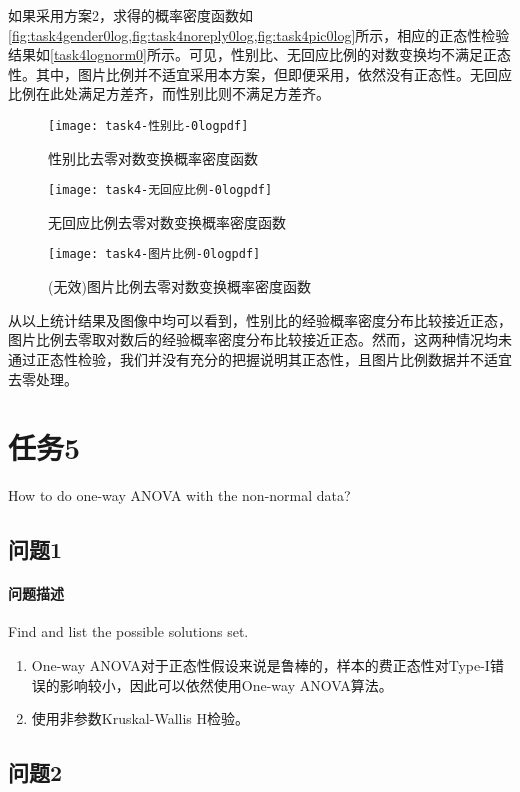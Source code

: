 \documentclass[a4paper,12pt]{article}
\begin{document}
    如果采用方案2，求得的概率密度函数如\cref{fig:task4gender0log,fig:task4noreply0log,fig:task4pic0log}所示，相应的正态性检验结果如\cref{task4lognorm0}所示。可见，性别比、无回应比例的对数变换均不满足正态性。其中，图片比例并不适宜采用本方案，但即便采用，依然没有正态性。无回应比例在此处满足方差齐，而性别比则不满足方差齐。
    \begin{figure}
      \texttt{[image: task4-性别比-0logpdf]}
      \caption{性别比去零对数变换概率密度函数}
      \label{fig:task4gender0log}
    \end{figure}
    \begin{figure}
      \texttt{[image: task4-无回应比例-0logpdf]}
      \caption{无回应比例去零对数变换概率密度函数}
      \label{fig:task4noreply0log}
    \end{figure}
    \begin{figure}
      \texttt{[image: task4-图片比例-0logpdf]}
      \caption{(无效)图片比例去零对数变换概率密度函数}
      \label{fig:task4pic0log}
    \end{figure}
    

    从以上统计结果及图像中均可以看到，性别比的经验概率密度分布比较接近正态，图片比例去零取对数后的经验概率密度分布比较接近正态。然而，这两种情况均未通过正态性检验，我们并没有充分的把握说明其正态性，且图片比例数据并不适宜去零处理。
    \section{任务5} %
    How to do one-way ANOVA with the non-normal data?
    \subsection{问题1} %
    \paragraph{问题描述} Find and list the possible solutions set.
    \begin{enumerate}
      \item One-way ANOVA对于正态性假设来说是鲁棒的，样本的费正态性对Type-I错误的影响较小，因此可以依然使用One-way ANOVA算法。
      \item 使用非参数Kruskal-Wallis H检验。
    \end{enumerate}
    \subsection{问题2}
\end{document}
